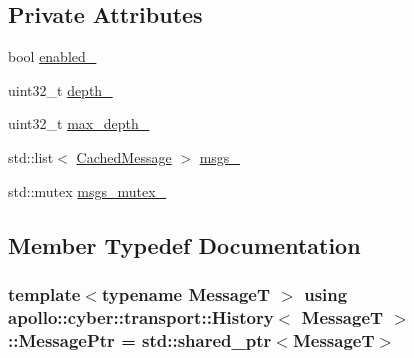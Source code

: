 \subsection*{Private Attributes}
\begin{DoxyCompactItemize}
\item 
bool \hyperlink{classapollo_1_1cyber_1_1transport_1_1History_a069e631128a251e29a0c5aa226bf6cf0}{enabled\-\_\-}
\item 
uint32\-\_\-t \hyperlink{classapollo_1_1cyber_1_1transport_1_1History_af3e8c06815f54811dbfd8c9ca57a9207}{depth\-\_\-}
\item 
uint32\-\_\-t \hyperlink{classapollo_1_1cyber_1_1transport_1_1History_aa9abd9c1faa847d3f1ab18be1915d5a2}{max\-\_\-depth\-\_\-}
\item 
std\-::list$<$ \hyperlink{structapollo_1_1cyber_1_1transport_1_1History_1_1CachedMessage}{Cached\-Message} $>$ \hyperlink{classapollo_1_1cyber_1_1transport_1_1History_a6e9ef1bf010e3890b0635309c59fe9ad}{msgs\-\_\-}
\item 
std\-::mutex \hyperlink{classapollo_1_1cyber_1_1transport_1_1History_ab0d0a8c6137aad70ce16d99a0bfcf381}{msgs\-\_\-mutex\-\_\-}
\end{DoxyCompactItemize}


\subsection{Member Typedef Documentation}
\hypertarget{classapollo_1_1cyber_1_1transport_1_1History_a4c11720b1c1d14eafb9fec5436a0d7c0}{
\subsubsection[{Message\-Ptr}]{\setlength{\rightskip}{0pt plus 5cm}template$<$typename Message\-T $>$ using {\bf apollo\-::cyber\-::transport\-::\-History}$<$ Message\-T $>$\-::{\bf Message\-Ptr} =  std\-::shared\-\_\-ptr$<$Message\-T$>$}}\label{classapollo_1_1cyber_1_1transport_1_1History_a4c11720b1c1d14eafb9fec5436a0d7c0}


